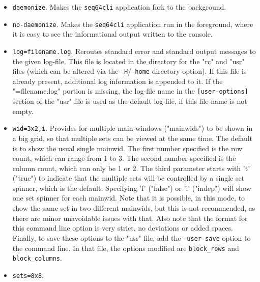       \begin{itemize}
         \item \texttt{daemonize}.
            Makes the \texttt{seq64cli} application
            fork to the background.
         \item \texttt{no-daemonize}.
            Makes the \texttt{seq64cli} application
            run in the foreground, where it is easy to see the informational
            output written to the console.
         \item \texttt{log=filename.log}.
            Reroutes standard error and standard
            output messages to the given log-file.  This file is located in the
            directory for the "rc" and "usr" files (which can be altered via
            the \texttt{-H}/\texttt{--home} directory option).  If this file is
            already present, additional log information is appended to it.  If
            the "=filename.log" portion is missing, the log-file name in the
            \texttt{[user-options]} section of the "usr" file is used as the
            default log-file, if this file-name is not empty.
         \item \texttt{wid=3x2,i}.
            Provides for multiple main windows ("mainwids") to be shown in a
            big grid, so that multiple sets can be viewed at the same time.
            The default is to show the usual single mainwid.
            The first number specified is the row count, which can range from 1
            to 3.  The second number specified is the column count, which can
            only be 1 or 2.  The third parameter starts with 't' ("true")
            to indicate that the multiple sets will be controlled by a single
            set spinner, which is the default.  Specifying 'f' ("false") or 'i'
            ("indep") will show one set spinner for each mainwid.  Note that it
            is possible, in this mode, to show the same set in two different
            mainwids, but this is not recommended, as there are minor
            unavoidable issues with that.  Also note that the format for this
            command line option is very strict, no deviations or added spaces.
            Finally, to save these options to the "usr" file, add the
            \texttt{--user-save} option to the command line.
            In that file, the options modified are \texttt{block\_rows} and
            \texttt{block\_columns}.
         \item \texttt{sets=8x8}.

\end{itemize}
